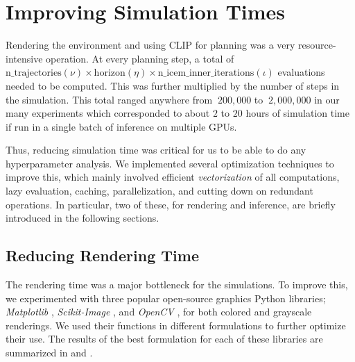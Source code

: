 

\chapter{Improving Simulation Times}
\label{sec:efficiency}
Rendering the environment and using CLIP for planning was a very resource-intensive operation.
At every planning step, a total of \(\text{n\_trajectories} (\nu) \times \text{horizon} (\eta) \times \text{n\_icem\_inner\_iterations} (\iota)\) evaluations needed to be computed.
This was further multiplied by the number of steps in the simulation.
This total ranged anywhere from \(~200,000\) to \(~2,000,000\) in our many experiments which corresponded to about \(2\) to \(20\) hours of simulation time if run in a single batch of inference on multiple GPUs.

Thus, reducing simulation time was critical for us to be able to do any hyperparameter analysis.
We implemented several optimization techniques to improve this, which mainly involved efficient \emph{vectorization} of all computations, lazy evaluation, caching, parallelization, and cutting down on redundant operations.
In particular, two of these, for rendering and inference, are briefly introduced in the following sections.

\section{Reducing Rendering Time}
\label{sec:improving-render}
The rendering time was a major bottleneck for the simulations.
To improve this, we experimented with three popular open-source graphics Python libraries; \emph{Matplotlib} \citep{matplotlib}, \emph{Scikit-Image} \citep{skimage}, and \emph{OpenCV} \citep{opencv}, for both colored and grayscale renderings.
We used their functions in different formulations to further optimize their use.
The results of the best formulation for each of these libraries are summarized in  and .\\

